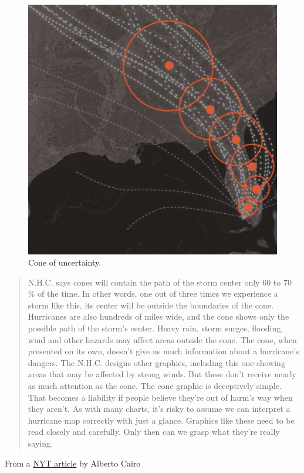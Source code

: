 \documentclass[
]{book}
\newenvironment{rnote}{\par\raggedleft}{\par}
\begin{document}
\begin{figure}

{\centering \includegraphics[width=0.66\linewidth]{Figures/hurricane-forecast-maps} 

}

\caption{Cone of uncertainty.}\label{fig:hurricane-map}
\end{figure}

\begin{quote}
N.H.C. says cones will contain the path of the storm center only 60 to 70 \% of the time. In other words, one out of three times we experience a storm like this, its center will be outside the boundaries of the cone. Hurricanes are also hundreds of miles wide, and the cone shows only the possible path of the storm's center. Heavy rain, storm surges, flooding, wind and other hazards may affect areas outside the cone. The cone, when presented on its own, doesn't give us much information about a hurricane's dangers. The N.H.C. designs other graphics, including this one showing areas that may be affected by strong winds. But these don't receive nearly as much attention as the cone. The cone graphic is deceptively simple. That becomes a liability if people believe they're out of harm's way when they aren't. As with many charts, it's risky to assume we can interpret a hurricane map correctly with just a glance. Graphics like these need to be read closely and carefully. Only then can we grasp what they're really saying.
\end{quote}

\begin{rnote}
From a \href{https://www.nytimes.com/interactive/2019/08/29/opinion/hurricane-dorian-forecast-map.html}{NYT article} by Alberto Cairo

\end{rnote}
\end{document}
